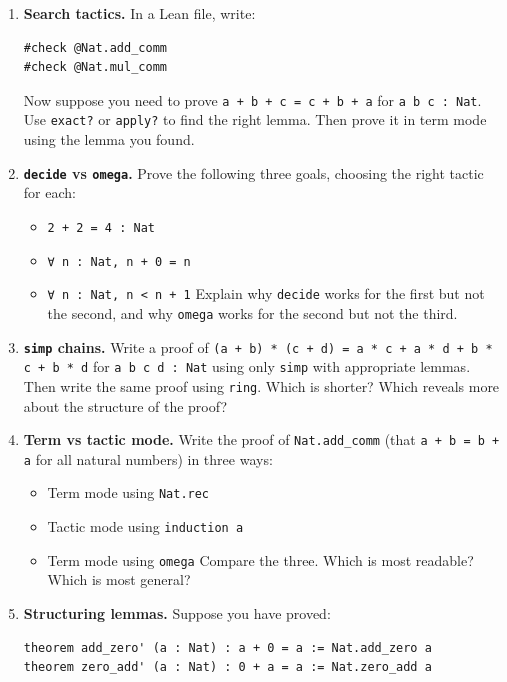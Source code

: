 \begin{enumerate}
\def\labelenumi{\arabic{enumi}.}
\item
  \textbf{Search tactics.} In a Lean file, write:

\begin{lstlisting}
#check @Nat.add_comm
#check @Nat.mul_comm
\end{lstlisting}

  Now suppose you need to prove \texttt{a + b + c = c + b + a} for \texttt{a b c : Nat}. Use \texttt{exact?} or \texttt{apply?} to find the right lemma. Then prove it in term mode using the lemma you found.
\item
  \textbf{\texttt{decide} vs \texttt{omega}.} Prove the following three goals, choosing the right tactic for each:

  \begin{itemize}
  \tightlist
  \item
    \texttt{2 + 2 = 4 : Nat}
  \item
    \texttt{∀ n : Nat, n + 0 = n}
  \item
    \texttt{∀ n : Nat, n < n + 1} Explain why \texttt{decide} works for the first but not the second, and why \texttt{omega} works for the second but not the third.
  \end{itemize}
\item
  \textbf{\texttt{simp} chains.} Write a proof of \texttt{(a + b) * (c + d) = a * c + a * d + b * c + b * d} for \texttt{a b c d : Nat} using only \texttt{simp} with appropriate lemmas. Then write the same proof using \texttt{ring}. Which is shorter? Which reveals more about the structure of the proof?
\item
  \textbf{Term vs tactic mode.} Write the proof of \texttt{Nat.add\_\allowbreak{}comm} (that \texttt{a + b = b + a} for all natural numbers) in three ways:

  \begin{itemize}
  \tightlist
  \item
    Term mode using \texttt{Nat.rec}
  \item
    Tactic mode using \texttt{induction a}
  \item
    Term mode using \texttt{omega} Compare the three. Which is most readable? Which is most general?
  \end{itemize}
\item
  \textbf{Structuring lemmas.} Suppose you have proved:

\begin{lstlisting}
theorem add_zero' (a : Nat) : a + 0 = a := Nat.add_zero a
theorem zero_add' (a : Nat) : 0 + a = a := Nat.zero_add a
\end{lstlisting}


\end{enumerate}
